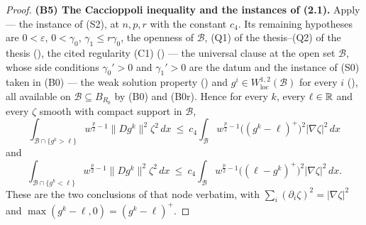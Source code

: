 \begin{proof}
\textbf{(B5) The Caccioppoli inequality and the instances of
\textup{(2.1)}.}  Apply  --- the instance of
(S2), at $n,p,r$ with the constant $c_4$.  Its remaining hypotheses are
$0<\varepsilon$, $0<\gamma_0$, $\gamma_1\le r\gamma_0$, the openness of
$\mathcal B$, (Q1) of the thesis--(Q2) of the thesis (), the
cited regularity (C1) () --- the universal clause
at the open set $\mathcal B$, whose side conditions $\gamma_0'>0$ and
$\gamma_1'>0$ are the datum and the instance of (S0) taken in (B0) --- the weak
solution
property () and
$g^i\in W^{1,2}_{\mathrm{loc}}(\mathcal B)$ for every $i$
(), all available on $\mathcal B\subseteq B_{R_0}$ by (B0)
and (B0r).  Hence for every $k$, every $\ell\in\mathbb{R}$ and every $\zeta$ smooth with
compact support in $\mathcal B$,
\[
\int_{\mathcal B\cap\{g^k>\ell\}}w^{\frac p2-1}\|Dg^k\|^2\zeta^2\,dx
\ \le\ c_4\int_{\mathcal B}w^{\frac p2-1}\bigl((g^k-\ell)^+\bigr)^2|\nabla\zeta|^2\,dx
\tag{3.4$^+$}
\]
and
\[
\int_{\mathcal B\cap\{g^k<\ell\}}w^{\frac p2-1}\|Dg^k\|^2\zeta^2\,dx
\ \le\ c_4\int_{\mathcal B}w^{\frac p2-1}\bigl((\ell-g^k)^+\bigr)^2|\nabla\zeta|^2\,dx .
\tag{3.4$^-$}
\]
These are the two conclusions of that node verbatim, with
$\sum_i(\partial_i\zeta)^2=|\nabla\zeta|^2$ and
$\max(g^k-\ell,0)=(g^k-\ell)^+$.


\end{proof}
